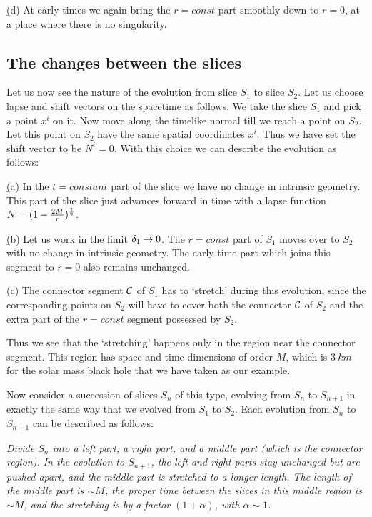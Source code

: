 \documentclass[12pt]{article}
\begin{document}
\b


(d) At early times we again bring the $r=const$ part smoothly down to $r=0$, at a place where there is no singularity. 

\subsection{The changes between the slices}\label{slicing}

Let us now see the nature of the evolution from slice ${ S}_1$ to slice ${S}_2$. Let us choose lapse and shift vectors on the spacetime as follows. We take the slice ${ S}_1$ and pick a point $x^i$ on it. Now move along the timelike normal till we reach a point on ${ S}_2$. Let  this point on ${ S}_2$ have the same spatial coordinates  $x^i$. Thus we have set the shift vector to be $N^i=0$. With this choice we can describe the evolution as follows:

\b

(a)  In the $t=constant$ part of the slice we have no change in intrinsic geometry. This part of the slice just advances forward in time with a lapse function $N=(1-{2M\over r})^{1\over 2}$.

\b


(b)  Let us work in the limit $\delta_1\rightarrow 0$. The $r=const$ part of ${ S}_1$ moves over to ${S}_2$ with no change in intrinsic geometry. The early time part which joins this segment to $r=0$ also remains unchanged. 

\b


(c) The connector segment ${\cal C}$ of ${ S}_1$ has to `stretch' during this evolution, since the corresponding points on ${ S}_2$ will have to cover both  the connector ${\cal C}$ of ${ S}_2$ and the extra part of the $r=const$ segment possessed by ${ S}_2$. 

\b


Thus we see that the `stretching' happens only in the region near the connector segment. This region has space and time dimensions of order $M$, which is $3~km$ for the solar mass black hole that we have taken as our example. 

Now consider a succession of slices ${ S}_n$ of this type, evolving from ${ S}_n$ to ${ S}_{n+1}$ in exactly the same way that we evolved from ${ S}_1$ to ${ S}_2$. Each evolution from ${ S}_n$ to ${ S}_{n+1}$ can be described as follows:

\b

{\it Divide ${ S}_n$ into a left part, a right part, and a middle part (which is the connector region). In the evolution to  ${ S}_{n+1}$, the left and right parts stay unchanged but are pushed apart, and the middle part is stretched to a longer length. The length of the middle part is $\sim M$, the proper time between the slices in this middle region is $\sim M$, and the stretching is by a factor $(1+\alpha)$, with $\alpha\sim 1$.}
\end{document}
